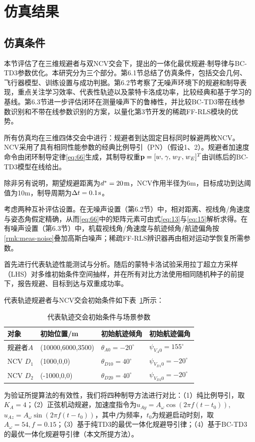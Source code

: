 \section{仿真结果}
\subsection{仿真条件}
本节评估了在三维规避者与双NCV交会下，提出的一体化最优规避-制导律与BC-TD3参数优化。本研究分为三个部分。第6.1节总结了仿真条件，包括交会几何、飞行器模型、训练设置与成功判据。第6.2节考察了无噪声环境下的规避和制导表现，重点关注学习效率、代表性轨迹以及蒙特卡洛成功率，比较经典和基于学习的基线。第6.3节进一步评估闭环在测量噪声下的鲁棒性，并比较BC-TD3带在线参数识别和不带在线参数识别的方案，以量化第3节开发的稀疏FF-RLS模块的优势。

所有仿真均在三维四体交会中进行：规避者到达固定目标同时躲避两枚NCV。NCV采用了具有相同性能参数的经典比例导引（PN）（假设1、2）。规避者加速度命令由闭环制导定律\eqref{eq:66}生成，其制导权重${\mathbf{p}} = {[w,{\kern 1pt} \gamma ,{\kern 1pt} {w_T},{\kern 1pt} {w_E}]^T}$由训练后的BC-TD3模型在线给出。

除非另有说明，期望规避距离为${d^*} = 20{\kern 1pt} {\text{m}}$，NCV作用半径为6m，目标成功到达阈值为10m，制导周期为$\Delta t = 0.1{\kern 1pt} {\text{s}}$。

考虑两种互补评估设置。在无噪声设置（第6.2节）中，相对距离、视线角/角速度与姿态角假定精确，从而\eqref{eq:66}中的矩阵元素可由式\eqref{eq:13}与\eqref{eq:15}解析求得。在有噪声设置（第6.3节）中，机载视线角/角速度与航迹倾角/航迹偏角按\cref{rmk:meas-noise}叠加高斯白噪声；稀疏FF-RLS辨识器再由相对运动学恢复所需参数。

首先进行代表轨迹性能测试与分析。随后的蒙特卡洛试验采用拉丁超立方采样（LHS）对多维初始条件空间抽样，并在所有对比方法使用相同随机种子的前提下，报告规避、目标到达与双重成功率。

代表轨迹规避者与NCV交会初始条件如下表~\ref{tab:init-traj}所示：

\begin{table}[htbp]
\centering
\caption{代表轨迹交会初始条件与场景参数}
\label{tab:init-traj}
\small
\begin{tabularx}{\linewidth}{lXXX}
\toprule
对象 & 初始位置/m & 初始航迹倾角 & 初始航迹偏角 \\
\midrule
规避者$A$ & (10000,6000,3500) & ${\theta _{A0}} =  - {20^ \circ }$ & ${\psi _{{V_A}0}} = {155^ \circ }$ \\
NCV ${D_1}$ & (1000,0,0) & ${\theta _{D10}} = {40^ \circ }$ & ${\psi _{{V_{D1}}0}} =  - {20^ \circ }$ \\
NCV ${D_2}$ & (-1000,0,0) & ${\theta _{D20}} = {40^ \circ }$ & ${\psi _{{V_{D2}}0}} =  - {20^ \circ }$ \\
\bottomrule
\end{tabularx}
\end{table}
为验证所提算法的有效性，我们将四种制导方法进行对比：（1）纯比例导引，取${K_A} = 4$；（2）正弦机动规避，加速度指令为${u_{Ay}} = {A_\omega }\cos (2\pi f(t - {t_0}))$, ${u_{Az}} = {A_\omega }\sin (2\pi f(t - {t_0}))$，其中$f$为频率，${t_0}$为规避启动时刻，取${A_\omega } = 54,f = 0.15$；（3）基于纯TD3的最优一体化规避导引律；（4）基于BC-TD3的最优一体化规避导引律（本文所提方法）。

